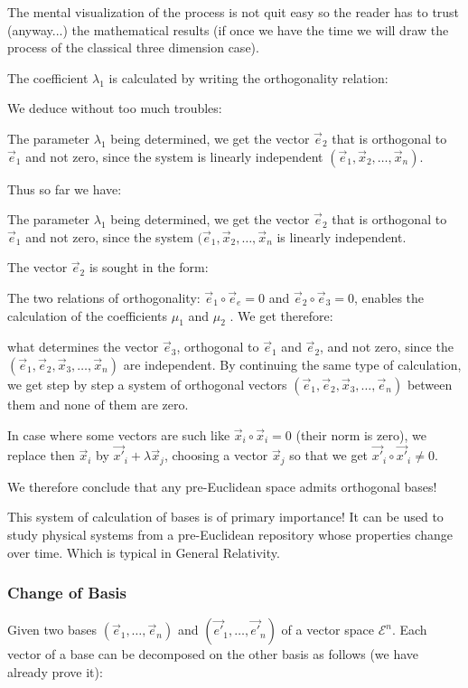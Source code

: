 	The mental visualization of the process is not quit easy so the reader has to trust (anyway...) the mathematical results (if once we have the time we will draw the process of the classical three dimension case).
	
	The coefficient $\lambda_1$ is calculated by writing the orthogonality relation:
	
	We deduce without too much troubles:
	
	The parameter $\lambda_1$ being determined, we get the vector $\vec{e}_2$ that is orthogonal to $\vec{e}_1$ and not zero, since the system is linearly independent $(\vec{e}_1,\vec{x}_2,\ldots,\vec{x}_n)$.
	
	Thus so far we have:
	
	The parameter $\lambda_1$ being determined, we get the vector $\vec{e}_2$ that is orthogonal to $\vec{e}_1$ and not zero, since the system $(\vec{e}_1,\vec{x}_2,\ldots,\vec{x}_n$ is linearly independent.
	
	The vector $\vec{e}_2$ is sought in the form:
	
	The two relations of orthogonality: $\vec{e}_1\circ\vec{e}_e=0$ and $\vec{e}_2\circ\vec{e}_3=0$, enables the calculation of the coefficients $\mu_1$ and $\mu_2$ . We get therefore:
	
	what determines the vector $\vec{e}_3$, orthogonal to $\vec{e}_1$ and $\vec{e}_2$, and not zero, since the $(\vec{e}_1,\vec{e}_2,\vec{x}_3,\ldots,\vec{x}_n)$ are independent. By continuing the same type of calculation, we get step by step a system of orthogonal vectors $(\vec{e}_1,\vec{e}_2,\vec{x}_3,\ldots,\vec{e}_n)$ between them and none of them are zero.
	
	In case where some vectors are such like $\vec{x}_i\circ\vec{x}_i=0$ (their norm is zero), we replace then $\vec{x}_i$ by $\vec{x'}_i+\lambda\vec{x}_j$, choosing a vector $\vec{x}_j$ so that we get $\vec{x'}_i\circ\vec{x'}_i\neq 0$.
	
	We therefore conclude that any pre-Euclidean space admits orthogonal bases!

	This system of calculation of bases is of primary importance! It can be used to study physical systems from a pre-Euclidean repository whose properties change over time. Which is typical in General Relativity.

	\subsubsection{Change of Basis}
	Given two bases $(\vec{e}_1,\ldots,\vec{e}_n)$ and $(\vec{e'}_1,\ldots,\vec{e'}_n)$ of a vector space $\mathcal{E}^n$. Each vector of a base can be decomposed on the other basis as follows (we have already prove it):
	
